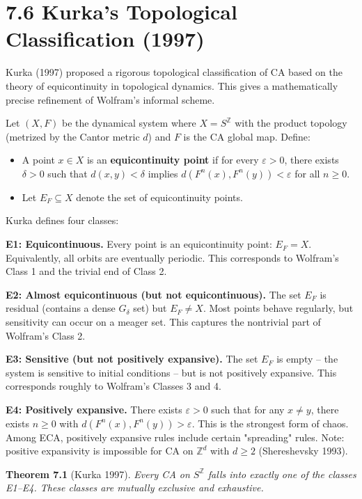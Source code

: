 \section{7.6 Kurka's Topological Classification (1997)}

Kurka (1997) proposed a rigorous topological classification of CA based on the theory of equicontinuity in topological dynamics. This gives a mathematically precise refinement of Wolfram's informal scheme.

Let $(X, F)$ be the dynamical system where $X = S^{\mathbb{Z}}$ with the product topology (metrized by the Cantor metric $d$) and $F$ is the CA global map. Define:

\begin{itemize}
  \item A point $x \in X$ is an \textbf{equicontinuity point} if for every $\varepsilon > 0$, there exists $\delta > 0$ such that $d(x, y) < \delta$ implies $d(F^n(x), F^n(y)) < \varepsilon$ for all $n \geq 0$.
  \item Let $E_F \subseteq X$ denote the set of equicontinuity points.
\end{itemize}

Kurka defines four classes:

\textbf{E1: Equicontinuous.} Every point is an equicontinuity point: $E_F = X$. Equivalently, all orbits are eventually periodic. This corresponds to Wolfram's Class 1 and the trivial end of Class 2.

\textbf{E2: Almost equicontinuous (but not equicontinuous).} The set $E_F$ is residual (contains a dense $G_\delta$ set) but $E_F \neq X$. Most points behave regularly, but sensitivity can occur on a meager set. This captures the nontrivial part of Wolfram's Class 2.

\textbf{E3: Sensitive (but not positively expansive).} The set $E_F$ is empty -- the system is sensitive to initial conditions -- but is not positively expansive. This corresponds roughly to Wolfram's Classes 3 and 4.

\textbf{E4: Positively expansive.} There exists $\varepsilon > 0$ such that for any $x \neq y$, there exists $n \geq 0$ with $d(F^n(x), F^n(y)) > \varepsilon$. This is the strongest form of chaos. Among ECA, positively expansive rules include certain "spreading" rules. Note: positive expansivity is impossible for CA on $\mathbb{Z}^d$ with $d \geq 2$ (Shereshevsky 1993).

\textbf{Theorem 7.1} (Kurka 1997). \textit{Every CA on $S^{\mathbb{Z}}$ falls into exactly one of the classes E1--E4. These classes are mutually exclusive and exhaustive.}

